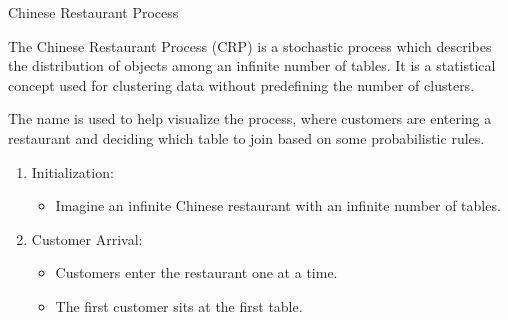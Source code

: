 \documentclass[xcolor={dvipsnames}]{beamer}
\begin{document}
\begin{frame}{Chinese Restaurant Process}

The Chinese Restaurant Process (CRP) is a stochastic process which describes the distribution of objects among an infinite number of tables. It is a statistical concept used for clustering data without predefining the number of clusters.

\hfill

The name is used to help visualize the process, where customers are entering a restaurant and deciding which table to join based on some probabilistic rules.

\hfill

\pause

\begin{enumerate}
    \item<2-> Initialization:
    \begin{itemize}
        \item Imagine an infinite Chinese restaurant with an infinite number of tables.
    \end{itemize}
    
    \item<3> Customer Arrival:
    \begin{itemize}
        \item Customers enter the restaurant one at a time.
        \item The first customer sits at the first table.
    \end{itemize}

\end{enumerate}
    
\end{frame}
\end{document}
